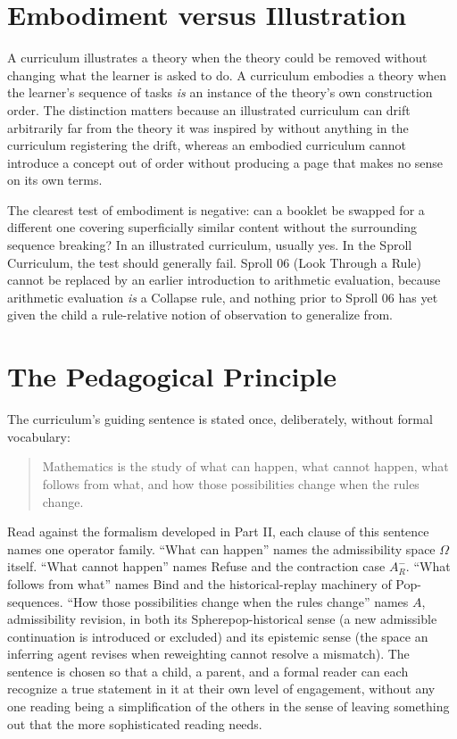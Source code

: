 \documentclass[11pt,twoside]{book}
\begin{document}
\section{Embodiment versus Illustration}

A curriculum illustrates a theory when the theory could be removed without changing what the learner is asked to do. A curriculum embodies a theory when the learner's sequence of tasks \emph{is} an instance of the theory's own construction order. The distinction matters because an illustrated curriculum can drift arbitrarily far from the theory it was inspired by without anything in the curriculum registering the drift, whereas an embodied curriculum cannot introduce a concept out of order without producing a page that makes no sense on its own terms.

The clearest test of embodiment is negative: can a booklet be swapped for a different one covering superficially similar content without the surrounding sequence breaking? In an illustrated curriculum, usually yes. In the Sproll Curriculum, the test should generally fail. Sproll 06 (Look Through a Rule) cannot be replaced by an earlier introduction to arithmetic evaluation, because arithmetic evaluation \emph{is} a Collapse rule, and nothing prior to Sproll 06 has yet given the child a rule-relative notion of observation to generalize from.

\section{The Pedagogical Principle}

The curriculum's guiding sentence is stated once, deliberately, without formal vocabulary:

\begin{quote}
Mathematics is the study of what can happen, what cannot happen, what follows from what, and how those possibilities change when the rules change.
\end{quote}

Read against the formalism developed in Part II, each clause of this sentence names one operator family. ``What can happen'' names the admissibility space $\Omega$ itself. ``What cannot happen'' names Refuse and the contraction case $A_R^-$. ``What follows from what'' names Bind and the historical-replay machinery of Pop-sequences. ``How those possibilities change when the rules change'' names $A$, admissibility revision, in both its Spherepop-historical sense (a new admissible continuation is introduced or excluded) and its epistemic sense (the space an inferring agent revises when reweighting cannot resolve a mismatch). The sentence is chosen so that a child, a parent, and a formal reader can each recognize a true statement in it at their own level of engagement, without any one reading being a simplification of the others in the sense of leaving something out that the more sophisticated reading needs.
\end{document}
